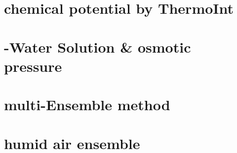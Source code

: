 \section{chemical potential by ThermoInt}
\label{sec:Example_chemical potential by ThermoInt}




\section{-Water Solution \& osmotic pressure}
\label{sec:Example_NaCl-Water Solution osmotic pressure}





\section{multi-Ensemble method}
\label{sec:Example_multi-Ensemble method}




\section{humid air ensemble}
\label{sec:Example_humid air ensemble}















